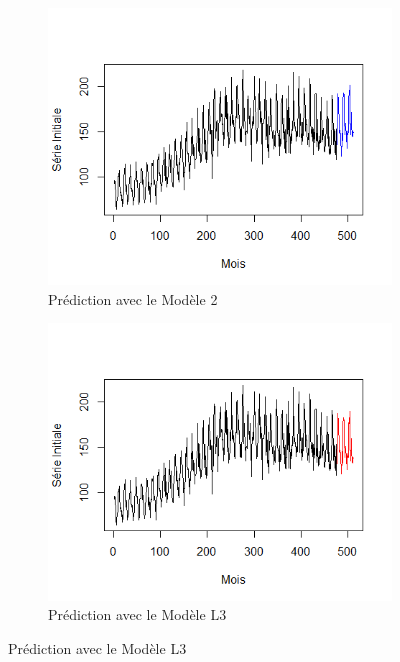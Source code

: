 \documentclass[12pt,a4paper]{book}
\newcommand{\1}{\mathds{1}}
\begin{document}
\begin{figure}[h!]
	\begin{subfigure}{.5\textwidth}
  		\centering
    	\includegraphics[width=\textwidth]{pred_mod2}  
    	\caption{Prédiction avec le Modèle 2}
    	\label{fig:sub1}
    \end{subfigure}
    \begin{subfigure}{.5\textwidth}
    	\centering
    	\includegraphics[width=\textwidth]{pred_modL3}  
    	\caption{Prédiction avec le Modèle L3}
    	\label{fig:sub2}
    \end{subfigure}
    

\end{figure}
\end{document}
